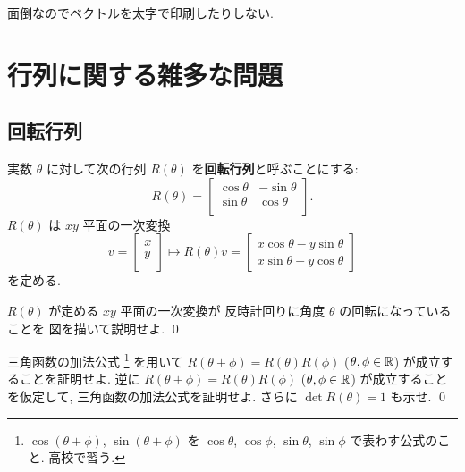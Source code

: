 \documentclass[12pt,twoside]{jarticle}
\begin{document}
面倒なのでベクトルを太字で印刷したりしない.

\newpage


\section{行列に関する雑多な問題}


\subsection{回転行列}
\label{sec:rotation-matrix}

実数 $\theta$ に対して次の行列 $R(\theta)$ を{\bf 回転行列}と呼ぶことにする:
\begin{equation*}
  R(\theta) =
  \left[
    \begin{array}{rr}
      \cos\theta & -\sin\theta \\
      \sin\theta &  \cos\theta \\
    \end{array}
  \right].
\end{equation*}
$R(\theta)$ は $xy$ 平面の一次変換
\begin{equation*}
  v =
  \begin{bmatrix}
    x \\ y \\
  \end{bmatrix}
  \mapsto
  R(\theta)v =
  \left[
    \begin{array}{r}
      x\cos\theta - y\sin\theta \\
      x\sin\theta + y\cos\theta
    \end{array}
  \right]
\end{equation*}
を定める.

\begin{question}
  $R(\theta)$ が定める $xy$ 平面の一次変換が
  反時計回りに角度 $\theta$ の回転になっていることを
  図を描いて説明せよ.  
  \qed
\end{question}

\begin{question}
  三角函数の加法公式%
  \footnote{$\cos(\theta+\phi)$, $\sin(\theta+\phi)$ 
    を $\cos\theta$, $\cos\phi$, $\sin\theta$, $\sin\phi$ で表わす公式のこと.
    高校で習う.}
  を用いて $R(\theta+\phi)=R(\theta)R(\phi)$ 
  ($\theta,\phi\in{\mathbb R}$) が成立することを証明せよ.
  逆に $R(\theta+\phi)=R(\theta)R(\phi)$ 
  ($\theta,\phi\in{\mathbb R}$) が成立することを仮定して, 
  三角函数の加法公式を証明せよ.
  さらに $\det R(\theta) = 1$ も示せ.
  \qed
\end{question}
\end{document}
